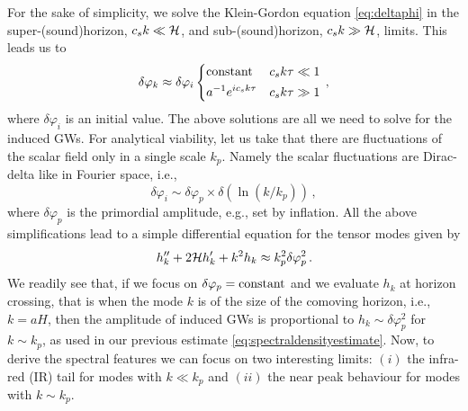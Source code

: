 \documentclass[a4paper,11pt]{article}
\numberwithin{equation}{section}
\begin{document}
For the sake of simplicity, we solve the Klein-Gordon equation \eqref{eq:deltaphi} in the super-(sound)horizon, $c_sk\ll{\cal H}$, and sub-(sound)horizon, $c_sk\gg{\cal H}$, limits. This leads us to
\begin{equation}\label{eq:deltaphics}
\delta\varphi_k\approx\delta\varphi_i\left\{
\begin{aligned}
&{\rm constant} & c_sk\tau\ll1 \\
&a^{-1}{e^{ic_sk\tau}}& c_sk\tau\gg 1 
\end{aligned}
\right.\,,
\end{equation}
where $\delta\varphi_i$ is an initial value.
The above solutions are all we need to solve for the induced GWs. For analytical viability, let us take that there are fluctuations of the scalar field only in a single scale $k_p$. Namely the scalar fluctuations are Dirac-delta like in Fourier space, i.e.,
\begin{equation}\label{eq:deltap}
\delta\varphi_i\sim \delta\varphi_p\times\delta(\ln(k/k_p))\,,
\end{equation}
where $\delta\varphi_p$ is the primordial amplitude, e.g., set by inflation.
All the above simplifications lead to a simple differential equation for the tensor modes given by
\begin{equation}\label{eq:hconformal}
h_k''+2{\cal H} h_k'+k^2h_k\approx{k_p^2}\delta\varphi_p^2\,.
\end{equation}
We readily see that, if we focus on $\delta\varphi_p={\rm constant}$ and we evaluate $h_k$ at horizon crossing, that is when the mode $k$ is of the size of the comoving horizon, i.e., $k=aH$, then the amplitude of induced GWs is proportional to $h_k\sim \delta\varphi_p^2$ for $k\sim k_p$, as used in our previous estimate \eqref{eq:spectraldensityestimate}. Now, to derive the spectral features we can focus on two interesting limits: $(i)$ the infra-red (IR) tail for modes with $k\ll k_p$ and $(ii)$ the near peak behaviour for modes with $k\sim k_p$.
\end{document}
